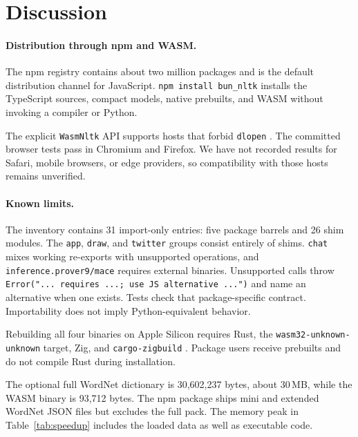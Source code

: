 \documentclass[pdflatex,sn-mathphys-num]{sn-jnl}
\theoremstyle{thmstyleone}
\begin{document}
\section{Discussion}\label{sec:discussion}

\paragraph{Distribution through npm and WASM.}

The npm registry contains about two million packages and is the default distribution channel for JavaScript. \texttt{npm install bun\_nltk} installs the TypeScript sources, compact models, native prebuilts, and WASM without invoking a compiler or Python.

The explicit \texttt{WasmNltk} API supports hosts that forbid \texttt{dlopen} \cite{cloudflare2024}. The committed browser tests pass in Chromium and Firefox. We have not recorded results for Safari, mobile browsers, or edge providers, so compatibility with those hosts remains unverified.

\paragraph{Known limits.}

The inventory contains 31 import-only entries: five package barrels and 26 shim modules. The \texttt{app}, \texttt{draw}, and \texttt{twitter} groups consist entirely of shims. \texttt{chat} mixes working re-exports with unsupported operations, and \texttt{inference.prover9/mace} requires external binaries. Unsupported calls throw \texttt{Error("... requires ...; use JS alternative ...")} and name an alternative when one exists. Tests check that package-specific contract. Importability does not imply Python-equivalent behavior.

Rebuilding all four binaries on Apple Silicon requires Rust, the \texttt{wasm32-unknown-unknown} target, Zig, and \texttt{cargo-zigbuild} \cite{rust2024}. Package users receive prebuilts and do not compile Rust during installation.

The optional full WordNet dictionary is 30{,}602{,}237 bytes, about 30\,MB, while the WASM binary is 93{,}712 bytes. The npm package ships mini and extended WordNet JSON files but excludes the full pack. The memory peak in Table~\ref{tab:speedup} includes the loaded data as well as executable code.
\end{document}

